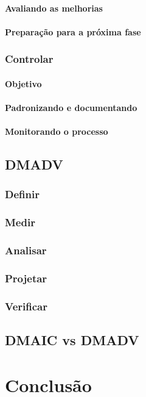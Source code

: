 \documentclass{abnt}
\begin{document}
					\subsubsection {Avaliando as melhorias}
					\subsubsection {Preparação para a próxima fase}
				\subsection {Controlar}
					\subsubsection {Objetivo}
					\subsubsection {Padronizando e documentando}
					\subsubsection {Monitorando o processo}
			\section {DMADV}
				\subsection {Definir}
				\subsection {Medir}
				\subsection {Analisar}
				\subsection {Projetar}
				\subsection {Verificar}
			\section {DMAIC vs DMADV}
	
	\chapter {Conclusão}
\end{document}
